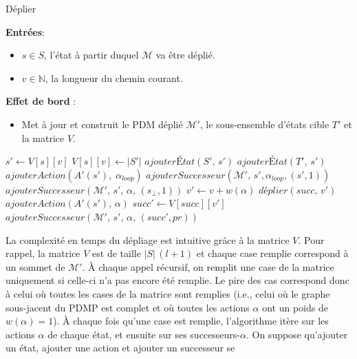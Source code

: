 \documentclass[12pt,a4paper]{report}
\theoremstyle{definition}%
\theoremstyle{remark}
\let\labelitemi\labelitemii
\begin{document}
\begin{algorithm}[H]
\caption{Déplier}
\hspace*{\algorithmicindent} \textbf{Entrées}:
	\begin{itemize}
		\renewcommand{\labelitemi}{\tiny$\bullet$}
		\item $s \in S$, l'état à partir duquel $\mathcal{M}$ va être déplié.
		\item $v \in \mathbb{N}$, la longueur du chemin courant.
	\end{itemize}
\hspace*{\algorithmicindent} \textbf{Effet de bord} :
	\begin{itemize}
	\renewcommand{\labelitemi}{\tiny$\bullet$}
	\item
	Met à jour et construit le PDM déplié $\mathcal{M}'$, le sous-ensemble d'états cible
	$T'$ et la matrice $V$.
	\end{itemize}
\begin{algorithmic}[1]
\STATE $s' \gets V[s][v]$
	\STATE $V[s][v] \gets |S'|$
	\STATE $ajouter\textit{\'E}tat(S', \, s')$
		\STATE $ajouter\textit{\'E}tat(T', \, s')$
		\STATE $ajouterAction(A'(s'), \; \alpha_{loop})$
		\STATE $ajouterSuccesseur(\mathcal{M}', \, s', \alpha_{loop}, (s',1))$
	\ELSE
				\STATE $ajouterSuccesseur(\mathcal{M}', \, s', \,  \alpha, \,  (s_\bot, 1))$
			\ELSE
					\STATE $v' \gets v + w(\alpha)$
					\STATE $\textit{déplier}(succ, \, v')$
					\STATE $ajouterAction(A'(s'), \, \alpha)$
					\STATE $succ' \gets V[succ][v']$
					\STATE $ajouterSuccesseur(\mathcal{M}', \, s', \, \alpha, \, (succ',pr))$
				\ENDFOR
			\ENDIF
		\ENDFOR
	\ENDIF
\ENDIF
\end{algorithmic}
\end{algorithm}
La complexité en temps du dépliage est intuitive grâce à la matrice $V$. Pour rappel, la matrice $V$ est de taille $|S| \, (l + 1)$ et chaque case remplie correspond à un sommet de $\mathcal{M}'$. \`A chaque appel récursif, on remplit une case de la matrice uniquement
si celle-ci n'a pas encore été remplie. Le pire des cas correspond donc à celui
où toutes les cases de la matrice sont remplies (i.e., celui où le graphe sous-jacent du PDMP est
complet et où toutes les actions $\alpha$ ont un poids de $w(\alpha) = 1$). \`A chaque fois qu'une case est remplie, l'algorithme itère sur les actions
$\alpha$ de chaque état, et ensuite sur ses successeurs-$\alpha$.
On suppose qu'ajouter un état, ajouter une action et ajouter un successeur se
\end{document}
